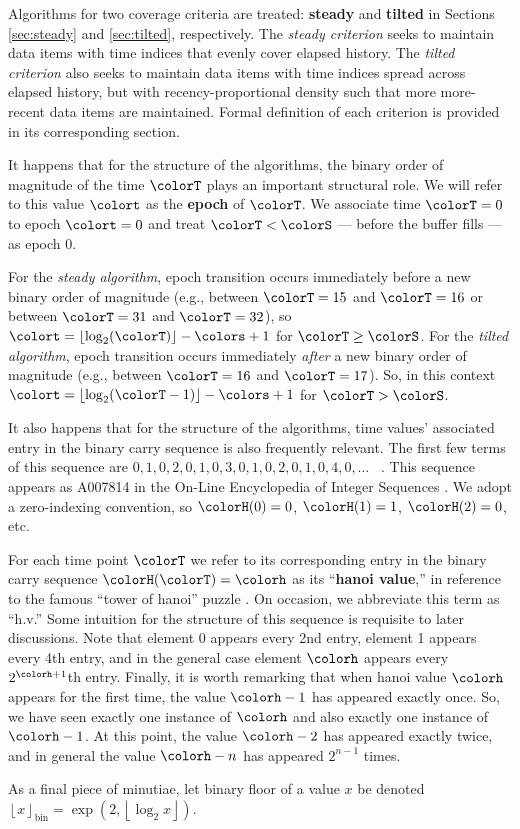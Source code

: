 Algorithms for two coverage criteria are treated: \textbf{steady} and \textbf{tilted} in Sections \ref{sec:steady} and \ref{sec:tilted}, respectively.
The \textit{steady criterion} seeks to maintain data items with time indices that evenly cover elapsed history.
The \textit{tilted criterion} also seeks to maintain data items with time indices spread across elapsed history, but with recency-proportional density such that more more-recent data items are maintained.
Formal definition of each criterion is provided in its corresponding section.

It happens that for the structure of the algorithms, the binary order of magnitude of the time $\colorT$ plays an important structural role.
We will refer to this value $\colort$ as the \textbf{epoch} of $\colorT$.
We associate time $\colorT=0$ to epoch $\colort=0$ and treat $\colorT < \colorS$ --- before the buffer fills --- as epoch 0.

For the \textit{steady algorithm}, epoch transition occurs immediately before a new binary order of magnitude (e.g., between $\colorT = 15$ and $\colorT = 16$ or between $\colorT = 31$ and $\colorT = 32$), so $\colort = \left\lfloor \log_2(\colorT) \right\rfloor - \colors + 1$ for $\colorT \geq \colorS$.
For the \textit{tilted algorithm}, epoch transition occurs immediately \textit{after} a new binary order of magnitude (e.g., between $\colorT = 16$ and $\colorT = 17$).
So, in this context $\colort = \left\lfloor \log_2(\colorT - 1) \right\rfloor - \colors + 1$ for $\colorT > \colorS$.

It also happens that for the structure of the algorithms, time values' associated entry in the binary carry sequence is also frequently relevant.
The first few terms of this sequence are $0, 1, 0, 2, 0, 1, 0, 3, 0, 1, 0, 2, 0, 1, 0, 4, 0, \ldots$ \, .
This sequence appears as A007814 in the On-Line Encyclopedia of Integer Sequences \citep{oeis}.
We adopt a zero-indexing convention, so $\colorH(0) = 0$, $\colorH(1) = 1$, $\colorH(2) = 0$, etc.

For each time point $\colorT$ we refer to its corresponding entry in the binary carry sequence $\colorH(\colorT) = \colorh$ as its ``\textbf{hanoi value},'' in reference to the famous ``tower of hanoi'' puzzle \citep{lucas1889jeux}.
On occasion, we abbreviate this term as ``h.v.''
Some intuition for the structure of this sequence is requisite to later discussions.
Note that element 0 appears every 2nd entry, element 1 appears every 4th entry, and in the general case element $\colorh$ appears every $2^{\colorh+1}$th entry.
Finally, it is worth remarking that when hanoi value $\colorh$ appears for the first time, the value $\colorh - 1$ has appeared exactly once.
So, we have seen exactly one instance of $\colorh$ and also exactly one instance of $\colorh - 1$.
At this point, the value $\colorh - 2$ has appeared exactly twice, and in general the value $\colorh - n$ has appeared $2^{n - 1}$ times.

As a final piece of minutiae, let binary floor of a value $x$ be denoted $\left\lfloor x \right\rfloor_\mathrm{bin} = \exp(2, \left\lfloor \log_2 x \right\rfloor)$.
